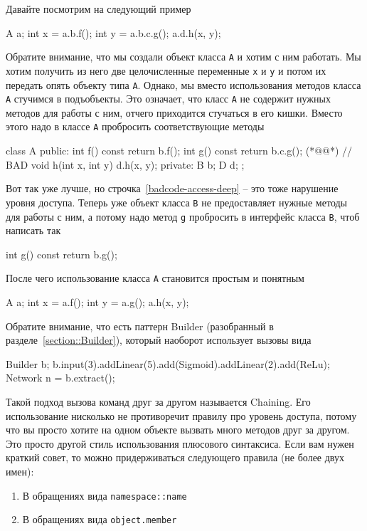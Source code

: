 Давайте посмотрим на следующий пример
\begin{cppcode}
A a;
int x = a.b.f();
int y = a.b.c.g();
a.d.h(x, y);
\end{cppcode}
Обратите внимание, что мы создали объект класса \verb"A" и хотим с ним работать.
Мы хотим получить из него две целочисленные переменные \verb"x" и \verb"y" и потом их передать опять объекту типа \verb"A".
Однако, мы вместо использования методов класса \verb"A" стучимся в подъобъекты.
Это означает, что класс \verb"A" не содержит нужных методов для работы с ним, отчего приходится стучаться в его кишки.
Вместо этого надо в классе \verb"A" пробросить соответствующие методы
\begin{cppcode}
class A {
public:
  int f() const {
    return b.f();
  }
  int g() const {
    return b.c.g(); (*@@*) // BAD
  }
  void h(int x, int y) {
    d.h(x, y);
  }
private:
  B b;
  D d;
};
\end{cppcode}
Вот так уже лучше, но строчка~\ref{badcode-access-deep} -- это тоже нарушение уровня доступа.
Теперь уже объект класса \verb"B" не предоставляет нужные методы для работы с ним, а потому надо метод \verb"g" пробросить в интерфейс класса \verb"B", чтоб написать так
\begin{cppcode}
int g() const {
  return b.g();
}
\end{cppcode}
После чего использование класса \verb"A" становится простым и понятным
\begin{cppcode}
A a;
int x = a.f();
int y = a.g();
a.h(x, y);
\end{cppcode}
Обратите внимание, что есть паттерн Builder (разобранный в разделе~\ref{section::Builder}), который наоборот использует вызовы вида
\begin{cppcode}
Builder b;
b.input(3).addLinear(5).add(Sigmoid).addLinear(2).add(ReLu);
Network n = b.extract();
\end{cppcode}
Такой подход вызова команд друг за другом называется Chaining.
Его использование нисколько не противоречит правилу про уровень доступа, потому что вы просто хотите на одном объекте вызвать много методов друг за другом.
Это просто другой стиль использования плюсового синтаксиса.
Если вам нужен краткий совет, то можно придерживаться следующего правила (не более двух имен):
\begin{enumerate}
\item В обращениях вида \verb"namespace::name"

\item В обращениях вида \verb"object.member"
\end{enumerate}
